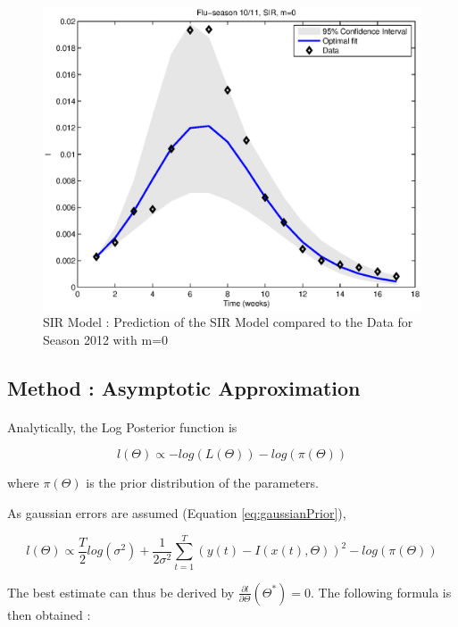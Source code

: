 \documentclass[11pt, a4paper]{article}
\begin{document}
\begin{figure}[h]
    \includegraphics[height = 0.25\textheight]{figures/SIR_prediction_season3_m=0.eps}
    \caption{SIR Model : Prediction of the SIR Model compared to the Data for Season 2012 with m=0}
    \label{fig:sir0_pred3}
\end{figure}

\subsection{Method : Asymptotic Approximation}
\paragraph{}
Analytically, the Log Posterior function is 

\begin{equation}
l(\Theta) \propto - log(L(\Theta)) - log(\pi(\Theta))
\end{equation}

where $\pi(\Theta)$ is the prior distribution of the parameters.

As gaussian errors are assumed (Equation \ref{eq:gaussianPrior}),

\begin{equation}
l(\Theta) \propto \frac{T}{2} log(\sigma^2) + \frac{1}{2 \sigma^2} \sum_{t=1}^T (y(t)-I(x(t), \Theta))^2 - log(\pi(\Theta))
\end{equation}

The best estimate can thus be derived by $\frac{\partial l}{\partial \Theta}(\Theta^*) = 0$. The following formula is then obtained :
\end{document}
